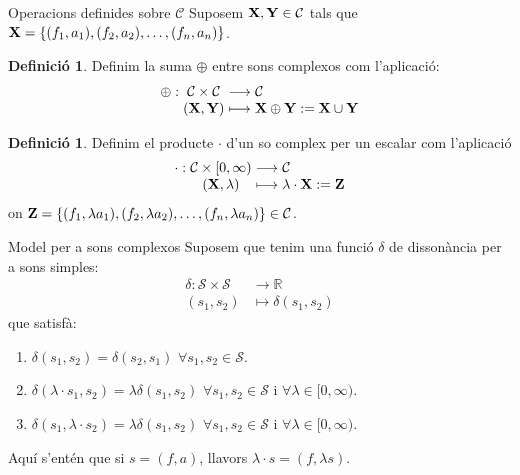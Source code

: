\documentclass[10pt,hyperref={colorlinks,linkcolor=black,citecolor=blue!80,urlcolor=blue!60},handout]{beamer} %
\theoremstyle{definition}
\newtheorem{defin}[theorem]{Definició}
\newcommand{\0}{\ensuremath{\vb{0}}}
\newcommand{\X}{\ensuremath{\vb{X}}}
\newcommand{\Y}{\ensuremath{\vb{Y}}}
\newcommand{\Z}{\ensuremath{\vb{Z}}}
\newcommand{\RR}{\ensuremath{\mathbb{R}}} %
\begin{document}
\begin{frame}{Operacions definides sobre $\mathcal{C}$}
    Suposem $\X,\Y\in\mathcal{C}$ tals que $\X=\{(f_1,a_1),(f_2,a_2),\ldots,(f_n,a_n)\}$.\par\pause
    \begin{defin}
        Definim la suma $\oplus$ entre sons complexos com l'aplicació:
        $$\begin{array}{r@{\hspace{0.5\tabcolsep}}c@{\hspace{0.5\tabcolsep}}c@{\hspace{0.5\tabcolsep}}l}
            \oplus:&\mathcal{C}\times\mathcal{C}&\longrightarrow&\mathcal{C}\\
            &(\X,\Y)&\longmapsto&\X\oplus \Y:=\X\cup\Y
        \end{array}$$
    \end{defin}\pause
    \begin{defin}
        Definim el producte $\cdot$ d'un so complex per un escalar com l'aplicació
        $$\begin{array}{r@{\hspace{0.5\tabcolsep}}c@{\hspace{0.5\tabcolsep}}c@{\hspace{0.5\tabcolsep}}l}
            \cdot:&\mathcal{C}\times[0,\infty)&\longrightarrow&\mathcal{C}\\
            &(\X,\lambda)&\longmapsto&\lambda\cdot \X:=\Z
        \end{array}$$
        on $\Z=\{(f_1,\lambda a_1),(f_2,\lambda a_2),\ldots,(f_n,\lambda a_n)\}\in\mathcal{C}$.
    \end{defin}  
\end{frame}
\begin{frame}{Model per a sons complexos}
    Suposem que tenim una funció $\delta$ de dissonància per a sons simples:
    \begin{align*}
        \delta:\mathcal{S}\times\mathcal{S}&\longrightarrow\RR\\
        (s_1,s_2)&\longmapsto\delta(s_1,s_2)
    \end{align*}
    que satisfà:
    \begin{enumerate}
        \item $\delta(s_1,s_2)=\delta(s_2,s_1)$ $\forall s_1,s_2\in\mathcal{S}$.\pause
        \item $\delta(\lambda\cdot s_1,s_2)=\lambda\delta(s_1,s_2)$ $\forall s_1,s_2\in\mathcal{S}$ i $\forall\lambda\in[0,\infty)$.\pause
        \item $\delta(s_1,\lambda\cdot s_2)=\lambda\delta(s_1,s_2)$ $\forall s_1,s_2\in\mathcal{S}$ i $\forall \lambda\in[0,\infty)$.\pause
    \end{enumerate}\vspace{0.3cm}
    Aquí s'entén que si $s=(f,a)$, llavors $\lambda\cdot s=(f,\lambda s)$.
\end{frame}
\end{document}
